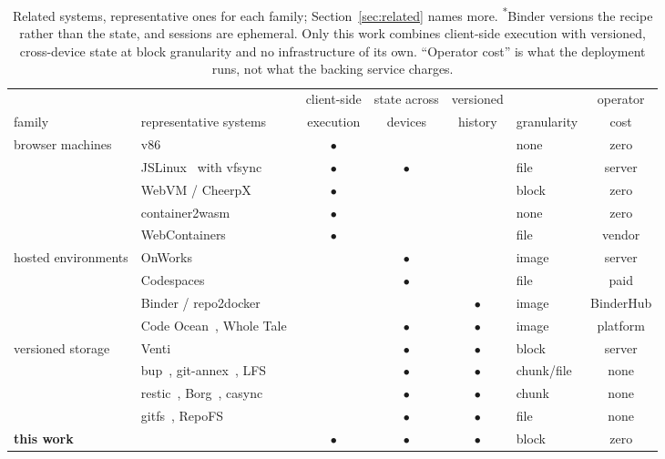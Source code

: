 \documentclass[journal,10pt]{IEEEtran}
\begin{document}
\begin{table}[t]
\caption{Related systems, representative ones for each family; Section~\ref{sec:related}
names more. \textsuperscript{*}Binder versions the recipe
rather than the state, and sessions are ephemeral. Only this work combines client-side execution with versioned, cross-device state
at block granularity and no infrastructure of its own. ``Operator cost'' is
what the deployment runs, not what the backing service charges.}
\small
\centering
\begin{tabular}{@{}llccclc@{}}
\toprule
& & client-side & state across & versioned & & operator \\
family & representative systems & execution & devices & history & granularity & cost \\
\midrule
browser machines
  & v86~\cite{v86} & $\bullet$ & & & none & zero \\
  & JSLinux~\cite{jslinux} with vfsync~\cite{vfsync} & $\bullet$ & $\bullet$ & & file & server \\
  & WebVM / CheerpX~\cite{webvm} & $\bullet$ & & & block & zero \\
  & container2wasm~\cite{c2w} & $\bullet$ & & & none & zero \\
  & WebContainers~\cite{webcontainers} & $\bullet$ & & & file & vendor \\
\addlinespace
hosted environments
  & OnWorks~\cite{onworks} & & $\bullet$ & & image & server \\
  & Codespaces~\cite{codespaces} & & $\bullet$ & & file & paid \\
  & Binder / repo2docker~\cite{binder,repo2docker} & & & $\bullet$\rlap{\,\textsuperscript{*}} & image & BinderHub \\
  & Code Ocean~\cite{codeocean}, Whole Tale~\cite{wholetale} & & $\bullet$ & $\bullet$ & image & platform \\
\addlinespace
versioned storage
  & Venti~\cite{venti} & & $\bullet$ & $\bullet$ & block & server \\
  & bup~\cite{bup}, git-annex~\cite{gitannex}, LFS~\cite{gitlfs} & & $\bullet$ & $\bullet$ & chunk/file & none \\
  & restic~\cite{restic}, Borg~\cite{borg}, casync~\cite{casync} & & $\bullet$ & $\bullet$ & chunk & none \\
  & gitfs~\cite{gitfs}, RepoFS~\cite{repofs} & & $\bullet$ & $\bullet$ & file & none \\
\addlinespace
\textbf{this work} & & $\bullet$ & $\bullet$ & $\bullet$ & block & zero \\
\bottomrule
\end{tabular}

\label{tab:related}
\end{table}
\end{document}
